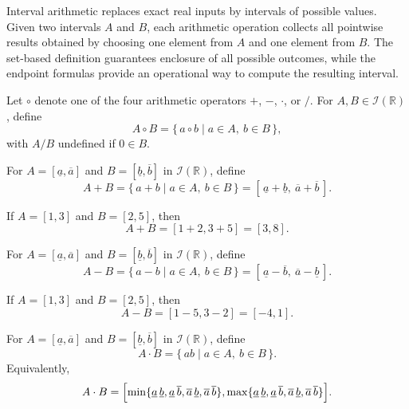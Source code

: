 \begin{remark*}[Exposition]
Interval arithmetic replaces exact real inputs by intervals of possible values.
Given two intervals $A$ and $B$, each arithmetic operation collects all
pointwise results obtained by choosing one element from $A$ and one element
from $B$. The set-based definition guarantees enclosure of all possible
outcomes, while the endpoint formulas provide an operational way to compute
the resulting interval.
\end{remark*}

\begin{definition}
\cite{UnknownIntroductionIntervalAnalysis2002}
\label{def:set-based-interval-operation}
Let $\circ$ denote one of the four arithmetic operators $+$, $-$, $\cdot$, or $/$.
For $A,B\in \mathcal{I}(\mathbb{R})$, define
\[
A\circ B
=
\{\,a\circ b\mid a\in A,\ b\in B\,\},
\]
with $A/B$ undefined if $0\in B$.
\end{definition}

\begin{definition}
\cite{UnknownIntroductionIntervalAnalysis2002}
\label{def:interval-addition}
For $A=[\underline a,\overline a]$ and
$B=[\underline b,\overline b]$ in $\mathcal{I}(\mathbb{R})$, define
\[
A+B
=
\{\,a+b\mid a\in A,\ b\in B\,\}
=
[\,\underline a+\underline b,\ \overline a+\overline b\,].
\]
\end{definition}

\begin{example}
If $A=[1,3]$ and $B=[2,5]$, then
\[
A+B=[1+2,3+5]=[3,8].
\]
\end{example}

\begin{definition}
\cite{UnknownIntroductionIntervalAnalysis2002}
\label{def:interval-subtraction}
For $A=[\underline a,\overline a]$ and
$B=[\underline b,\overline b]$ in $\mathcal{I}(\mathbb{R})$, define
\[
A-B
=
\{\,a-b\mid a\in A,\ b\in B\,\}
=
[\,\underline a-\overline b,\ \overline a-\underline b\,].
\]
\end{definition}

\begin{example}
If $A=[1,3]$ and $B=[2,5]$, then
\[
A-B=[1-5,3-2]=[-4,1].
\]
\end{example}

\begin{definition}
\cite{UnknownIntroductionIntervalAnalysis2002}
\label{def:interval-multiplication}
For $A=[\underline a,\overline a]$ and
$B=[\underline b,\overline b]$ in $\mathcal{I}(\mathbb{R})$, define
\[
A\cdot B
=
\{\,ab\mid a\in A,\ b\in B\,\}.
\]
Equivalently,
\[
A\cdot B
=
\Bigl[
\min\{
\underline a\,\underline b,
\underline a\,\overline b,
\overline a\,\underline b,
\overline a\,\overline b
\},
\max\{
\underline a\,\underline b,
\underline a\,\overline b,
\overline a\,\underline b,
\overline a\,\overline b
\}
\Bigr].
\]
\end{definition}

